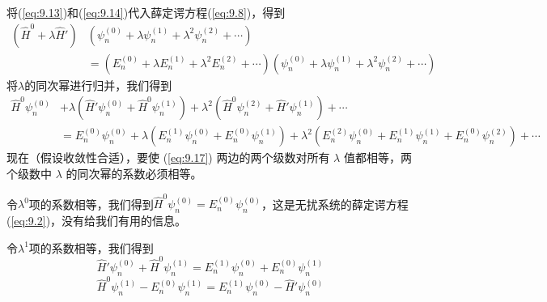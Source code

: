     将(\ref{eq:9.13})和(\ref{eq:9.14})代入薛定谔方程(\ref{eq:9.8})，得到
    \begin{equation*}
        \begin{aligned}
            \left(\hat{H}^0 + \lambda\hat{H}'\right)&\left(\psi_n^{\left(0\right)} + \lambda\psi_n^{\left(1\right)} + \lambda^2\psi_n^{\left(2\right)}+\cdots\right) \\
            &= \left(E_n^{\left(0\right)} + \lambda E_n^{\left(1\right)} + \lambda^2 E_n^{\left(2\right)}+\cdots\right)\left(\psi_n^{\left(0\right)} + \lambda\psi_n^{\left(1\right)} + \lambda^2\psi_n^{\left(2\right)}+\cdots\right)
        \end{aligned}
    \end{equation*}
    将$\lambda$的同次幂进行归并，我们得到
    \begin{equation}
        \begin{aligned}
            \hat{H}^0 \psi_n^{\left(0\right)} &+ \lambda \left(\hat{H}'\psi_n^{\left(0\right)} + \hat{H}^0\psi_n^{\left(1\right)}\right) + \lambda^2 \left(\hat{H}^0\psi_n^{\left(2\right)} + \hat{H}'\psi_n^{\left(1\right)}\right) + \cdots \\
            &= E_n^{\left(0\right)} \psi_n^{\left(0\right)} + \lambda \left(E_n^{\left(1\right)} \psi_n^{\left(0\right)} + E_n^{\left(0\right)} \psi_n^{\left(1\right)}\right) + \lambda^2 \left(E_n^{\left(2\right)} \psi_n^{\left(0\right)} + E_n^{\left(1\right)} \psi_n^{\left(1\right)} + E_n^{\left(0\right)} \psi_n^{\left(2\right)}\right) + \cdots
        \end{aligned}
        \label{eq:9.17}
    \end{equation}
    现在（假设收敛性合适），要使 (\ref{eq:9.17}) 两边的两个级数对所有 $\lambda$ 值都相等，两个级数中 $\lambda$ 的同次幂的系数必须相等。

    令$\lambda^0$项的系数相等，我们得到$\hat{H}^0 \psi_n^{\left(0\right)} = E_n^{\left(0\right)} \psi_n^{\left(0\right)}$，这是无扰系统的薛定谔方程(\ref{eq:9.2})，没有给我们有用的信息。

    令$\lambda^1$项的系数相等，我们得到
    \begin{equation*}
        \hat{H}'\psi_n^{\left(0\right)} + \hat{H}^0\psi_n^{\left(1\right)} = E_n^{\left(1\right)} \psi_n^{\left(0\right)} + E_n^{\left(0\right)} \psi_n^{\left(1\right)}
    \end{equation*}
    \begin{equation}
        \hat{H}^0\psi_n^{\left(1\right)} - E_n^{\left(0\right)} \psi_n^{\left(1\right)} = E_n^{\left(1\right)} \psi_n^{\left(0\right)} - \hat{H}'\psi_n^{\left(0\right)}
        \label{eq:9.18}
    \end{equation}

